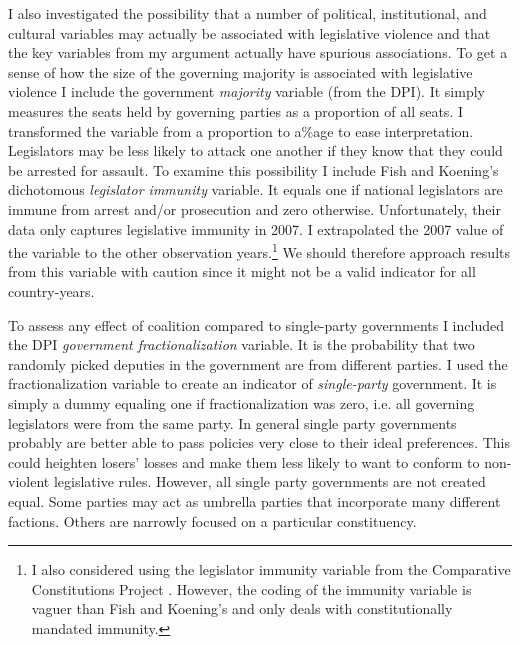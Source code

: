 \documentclass[a4paper]{article}\usepackage[]{graphicx}\usepackage[]{color}
\begin{document}
I also investigated the possibility that a number of political, institutional, and cultural variables may actually be associated with legislative violence and that the key variables from my argument actually have spurious associations. To get a sense of how the size of the governing majority is associated with legislative violence I include the government {\emph{majority}} variable (from the DPI). It simply measures the seats held by governing parties as a proportion of all seats. I transformed the variable from a proportion to a\%age to ease interpretation. Legislators may be less likely to attack one another if they know that they could be arrested for assault. To examine this possibility I include Fish and Koening's \citeyearpar{Fish2009} dichotomous \emph{legislator immunity} variable. It equals one if national legislators are immune from arrest and/or prosecution and zero otherwise. Unfortunately, their data only captures legislative immunity in 2007. I extrapolated the 2007 value of the variable to the other observation years.\footnote{I also considered using the legislator immunity variable from the Comparative Constitutions Project \citep{ElkinsCCP2010}. However, the coding of the immunity variable is vaguer than Fish and Koening's and only deals with constitutionally mandated immunity.} We should therefore approach results from this variable with caution since it might not be a valid indicator for all country-years.

To assess any effect of coalition compared to single-party governments I included the DPI {\emph{government fractionalization}} variable. It is the probability that two randomly picked deputies in the government are from different parties. I used the fractionalization variable to create an indicator of {\emph{single-party}} government. It is simply a dummy equaling one if fractionalization was zero, i.e. all governing legislators were from the same party. In general single party governments probably are better able to pass policies very close to their ideal preferences. This could heighten losers' losses and make them less likely to want to conform to non-violent legislative rules. However, all single party governments are not created equal. Some parties may act as umbrella parties that incorporate many different factions. Others are narrowly focused on a particular constituency.
\end{document}
